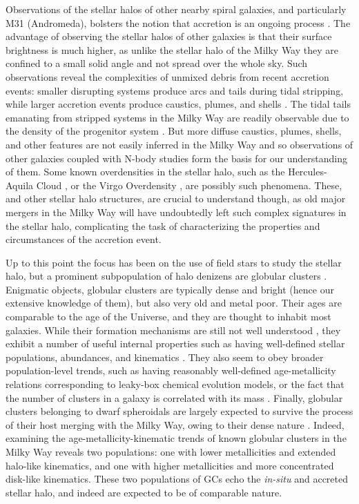 Observations of the stellar halos of other nearby spiral galaxies, and particularly M31 (Andromeda), bolsters the notion that accretion is an ongoing process \parencite{mcconnachie09,martinez-delgado10}. The advantage of observing the stellar halos of other galaxies is that their surface brightness is much higher, as unlike the stellar halo of the Milky Way they are confined to a small solid angle and not spread over the whole sky. Such observations reveal the complexities of unmixed debris from recent accretion events: smaller disrupting systems produce arcs and tails during tidal stripping, while larger accretion events produce caustics, plumes, and shells \parencite[][provides a good overview of such phenomena]{johnston08}. The tidal tails emanating from stripped systems in the Milky Way are readily observable due to the density of the progenitor system \parencite[e.g.][]{belokurov06}. But more diffuse caustics, plumes, shells, and other features are not easily inferred in the Milky Way and so observations of other galaxies coupled with N-body studies form the basis for our understanding of them. Some known overdensities in the stellar halo, such as the Hercules-Aquila Cloud \parencite{belokurov07b}, or the Virgo Overdensity \parencite{juric08}, are possibly such phenomena. These, and other stellar halo structures, are crucial to understand though, as old major mergers in the Milky Way will have undoubtedly left such complex signatures in the stellar halo, complicating the task of characterizing the properties and circumstances of the accretion event.

Up to this point the focus has been on the use of field stars to study the stellar halo, but a prominent subpopulation of halo denizens are globular clusters \parencite[for catalogues see][]{harris96,baumgardt18}. Enigmatic objects, globular clusters are typically dense and bright (hence our extensive knowledge of them), but also very old and metal poor. Their ages are comparable to the age of the Universe, and they are thought to inhabit most galaxies. While their formation mechanisms are still not well understood \parencite{forbes18a}, they exhibit a number of useful internal properties such as having well-defined stellar populations, abundances, and kinematics \parencite[although many also have multiple populations with slight differences,][]{milone22}. They also seem to obey broader population-level trends, such as having reasonably well-defined age-metallicity relations \parencite{forbes10,leaman13} corresponding to leaky-box chemical evolution models, or the fact that the number of clusters in a galaxy is correlated with its mass \parencite{harris13,forbes18b}. Finally, globular clusters belonging to dwarf spheroidals are largely expected to survive the process of their host merging with the Milky Way, owing to their dense nature \parencite{penarrubia09}. Indeed, examining the age-metallicity-kinematic trends of known globular clusters in the Milky Way reveals two populations: one with lower metallicities and extended halo-like kinematics, and one with higher metallicities and more concentrated disk-like kinematics. These two populations of GCs echo the \textit{in-situ} and accreted stellar halo, and indeed are expected to be of comparable nature.

